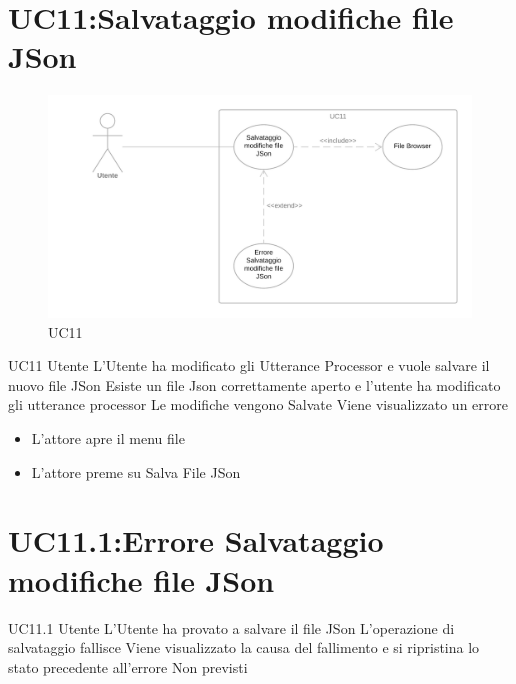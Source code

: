 \documentclass[../AnalisideiRequisiti.tex]{subfiles}
\begin{document}
\section{UC11:Salvataggio modifiche file JSon}
\begin{figure}[htp]
	\caption{UC11}
	\centering
	\includegraphics[width=\textwidth]{../img/UC11.png}
\end{figure}
\UserCase
{UC11}
{Utente}
{}
{L'Utente ha modificato gli Utterance Processor e vuole salvare il nuovo file JSon}
{Esiste un file Json correttamente aperto  e l'utente ha modificato gli utterance processor }
{Le modifiche vengono Salvate}
{Viene visualizzato un errore }
{\begin{itemize}
		\item{} L'attore apre il menu file 
		\item{} L'attore preme su Salva File JSon
\end{itemize}
}
\section{UC11.1:Errore Salvataggio modifiche file JSon}
\UserCase
{UC11.1}
{Utente}
{}
{L'Utente ha provato a salvare il file JSon}
{L'operazione di salvataggio fallisce }
{Viene visualizzato la causa del fallimento e si ripristina lo stato precedente all'errore}
{Non previsti}
{}
\end{document}
